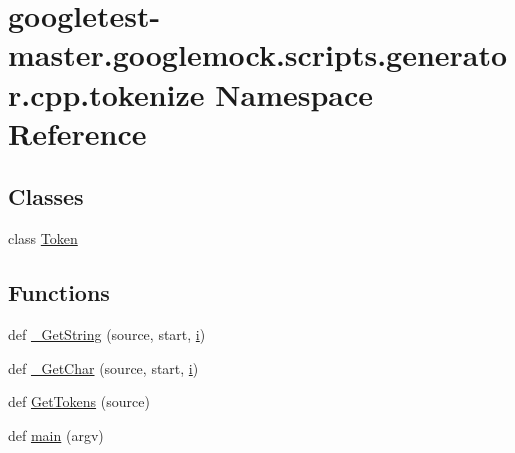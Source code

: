 \hypertarget{namespacegoogletest-master_1_1googlemock_1_1scripts_1_1generator_1_1cpp_1_1tokenize}{}\section{googletest-\/master.googlemock.\+scripts.\+generator.\+cpp.\+tokenize Namespace Reference}
\label{namespacegoogletest-master_1_1googlemock_1_1scripts_1_1generator_1_1cpp_1_1tokenize}
\subsection*{Classes}
\begin{DoxyCompactItemize}
\item 
class \mbox{\hyperlink{classgoogletest-master_1_1googlemock_1_1scripts_1_1generator_1_1cpp_1_1tokenize_1_1_token}{Token}}
\end{DoxyCompactItemize}
\subsection*{Functions}
\begin{DoxyCompactItemize}
\item 
def \mbox{\hyperlink{namespacegoogletest-master_1_1googlemock_1_1scripts_1_1generator_1_1cpp_1_1tokenize_acfe7658c5bcf9a1cfdc58a4c6d87acf6}{\+\_\+\+Get\+String}} (source, start, \mbox{\hyperlink{_obj__test_2lib_2googletest-master_2googlemock_2test_2gmock-matchers__test_8cc_acb559820d9ca11295b4500f179ef6392}{i}})
\item 
def \mbox{\hyperlink{namespacegoogletest-master_1_1googlemock_1_1scripts_1_1generator_1_1cpp_1_1tokenize_a7f0c078163faac84d75890ac4cca3517}{\+\_\+\+Get\+Char}} (source, start, \mbox{\hyperlink{_obj__test_2lib_2googletest-master_2googlemock_2test_2gmock-matchers__test_8cc_acb559820d9ca11295b4500f179ef6392}{i}})
\item 
def \mbox{\hyperlink{namespacegoogletest-master_1_1googlemock_1_1scripts_1_1generator_1_1cpp_1_1tokenize_a9921eb232bd9bc73c6dffee1b856c88a}{Get\+Tokens}} (source)
\item 
def \mbox{\hyperlink{namespacegoogletest-master_1_1googlemock_1_1scripts_1_1generator_1_1cpp_1_1tokenize_add34c8c07052cb29832e932882e79d35}{main}} (argv)
\end{DoxyCompactItemize}
